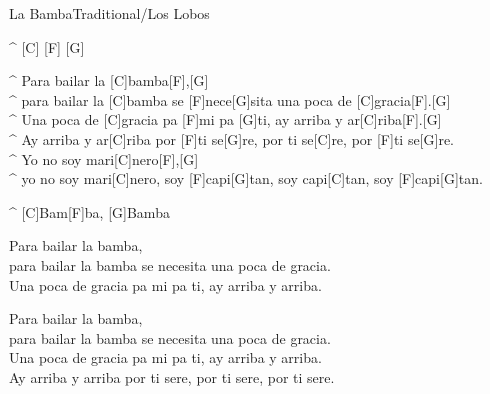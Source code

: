 \begin{song}{La Bamba}{Traditional/Los Lobos}

\begin{guitar}
^ [C] [F] [G]\\

\end{guitar}
\begin{guitar}
^ Para bailar la [C]bamba[F],[G]\\
^ para bailar la [C]bamba se [F]nece[G]sita una poca de [C]gracia[F].[G]\\
^ Una poca de [C]gracia pa [F]mi pa [G]ti, ay arriba y ar[C]riba[F].[G]\\
^ Ay arriba y ar[C]riba por [F]ti se[G]re, por ti se[C]re, por [F]ti se[G]re.\\
^ Yo no soy mari[C]nero[F],[G]\\
^ yo no soy mari[C]nero, soy [F]capi[G]tan, soy capi[C]tan, soy [F]capi[G]tan.\\
\end{guitar}

\begin{guitar}
^ [C]Bam[F]ba,  [G]Bamba\\
\end{guitar}

\begin{guitar}
Para bailar la bamba,\\
para bailar la bamba se necesita una poca de gracia.\\
Una poca de gracia pa mi pa ti, ay arriba y arriba.\\
\end{guitar}


\newpage
{}
\begin{guitar}
Para bailar la bamba,\\
para bailar la bamba se necesita una poca de gracia.\\
Una poca de gracia pa mi pa ti, ay arriba y arriba.\\
Ay arriba y arriba por ti sere, por ti sere, por ti sere.\\
\end{guitar}




\end{song}
